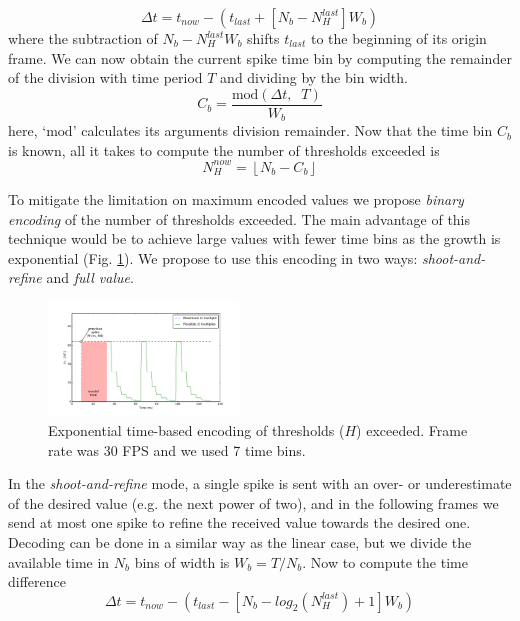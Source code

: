 \documentclass[twocolumn, a4paper]{article}
\begin{document}
\begin{equation}
\Delta t = t_{now} -  \left(t_{last} + \left[N_{b} - N_{H}^{last}\right]W_{b}\right)
\label{eq:time_diff}
\end{equation}
where the subtraction of $N_{b} - N_{H}^{last}W_{b}$ shifts $t_{last}$ to the beginning of its origin frame. We can now obtain the current spike time bin by computing the remainder of the division with time period $T$ and dividing by the bin width.
\begin{equation}
C_{b} = \frac{\mathrm{mod}\left(\Delta t, \;\; T\right)}{W_{b}}
\label{eq:bin_compute}
\end{equation}
here, `$\mathrm{mod}$' calculates its arguments division remainder. Now that the time bin $C_{b}$ is known, all it takes to compute the number of thresholds exceeded is
\begin{equation}
 N_{H}^{now} = \left\lfloor N_{b} - C_{b} \right\rfloor
 \label{eq:new_Nh_linear}
\end{equation}

To mitigate the limitation on maximum encoded values  we propose \textit{binary encoding} of the number of thresholds exceeded. The main advantage of this technique would be to achieve large values with fewer time bins as the growth is exponential (Fig. \ref{fig:exponential_time}). We propose to use this encoding in two ways: \textit{shoot-and-refine} and \textit{full value}. 

\begin{figure}[htb]
  \includegraphics[width=0.45\textwidth]{spike_values_exp}

  \caption{Exponential time-based encoding of thresholds ($H$) exceeded. Frame rate was 30 FPS and we used 7 time bins. }
  \label{fig:exponential_time}
\end{figure} 

In the \textit{shoot-and-refine} mode, a single spike is sent with an over- or underestimate of the desired value (e.g. the next power of two), and in the following frames we send at most one spike to refine the received value towards the desired one. Decoding can be done in a similar way as the linear case, but we divide the available time in $N_{b}$ bins of width is $W_{b} = T/N_{b}$. Now to compute the time difference
\begin{equation}
\Delta t = t_{now} - \left( t_{last} - 
                            \left[N_{b} - log_{2}(N_{H}^{last}) + 1\right]W_{b}
                     \right)
\label{eq:time_diff_exp}
\end{equation}
\end{document}
